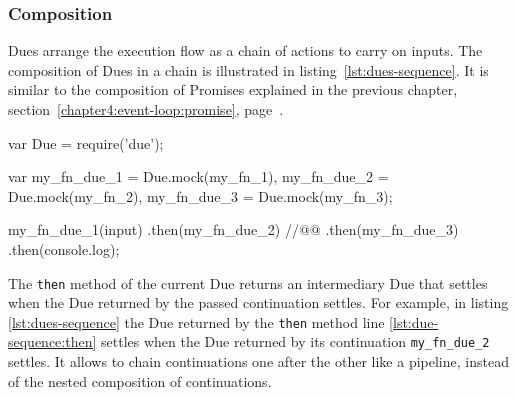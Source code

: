 

\subsubsection{Composition}

Dues arrange the execution flow as a chain of actions to carry on inputs.
The composition of Dues in a chain is illustrated in listing~\ref{lst:dues-sequence}.
It is similar to the composition of Promises explained in the previous chapter, section~\ref{chapter4:event-loop:promise}, page~\pageref{chapter4:event-loop:promise}.

\begin{code}[js, %
             caption={Dues are chained like Promises}, %
             label={lst:dues-sequence}] %
var Due = require('due');

var my_fn_due_1 = Due.mock(my_fn_1),
    my_fn_due_2 = Due.mock(my_fn_2),
    my_fn_due_3 = Due.mock(my_fn_3);

my_fn_due_1(input)
.then(my_fn_due_2) //@\label{lst:due-sequence:then}@
.then(my_fn_due_3)
.then(console.log);
\end{code}

The \texttt{then} method of the current Due returns an intermediary Due that settles when the Due returned by the passed continuation settles.
For example, in listing \ref{lst:dues-sequence} the Due returned by the \texttt{then} method line \ref{lst:due-sequence:then} settles when the Due returned by its continuation \texttt{my\_fn\_due\_2} settles.
It allows to chain continuations one after the other like a pipeline, instead of the nested composition of continuations.






